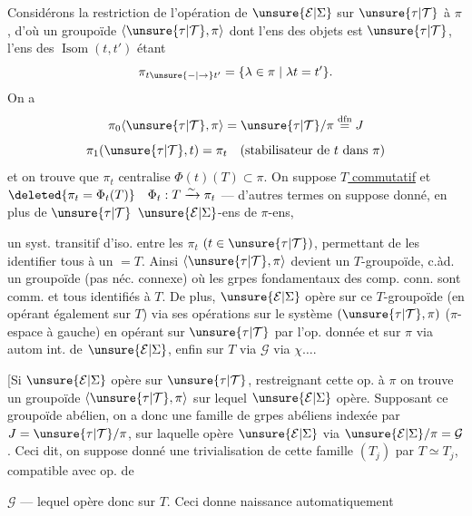 Considérons la restriction de l'opération de $\unsure{\mathcal E|\Sigma}$ sur $\unsure{\tau|\mathcal T}$ à $\pi$, d'où un groupoïde $\langle\unsure{\tau|\mathcal T},\pi\rangle$ dont l'ens des objets est $\unsure{\tau|\mathcal T}$, l'ens des $\operatorname{Isom}(t,t')$ étant
\[
\pi_{t\unsure{\mathbin{-}|\to}t'}=\{\lambda\in\pi\mid\lambda t=t'\}.
\]
 On a
\[
\pi_0\langle\unsure{\tau|\mathcal T},\pi\rangle=\unsure{\tau|\mathcal T}/\pi\overset{\mathrm{dfn}}{=}J
\]
\[
\pi_1(\unsure{\tau|\mathcal T},t)=\pi_t\quad(\text{stabilisateur de }t\text{ dans }\pi)
\]
et on trouve que $\pi_t$ centralise $\Phi(t)(T)\subset\pi$. On suppose \uline{$T$ commutatif} et $\deleted{\pi_t=\Phi_t(T)}\quad\Phi_t:T\xrightarrow{\sim}\pi_t$ ---  d'autres termes on suppose donné, en plus de $\unsure{\tau|\mathcal T}$ $\unsure{\mathcal E|\Sigma}$-ens de $\pi$-ens,

un syst. transitif d'iso. entre les $\pi_t$ $(t\in\unsure{\tau|\mathcal T})$, permettant de les identifier tous à un $=T$. Ainsi $\langle\unsure{\tau|\mathcal T},\pi\rangle$ devient un $T$-groupoïde, c.àd. un groupoïde (pas néc. connexe) où les grpes fondamentaux des comp. conn. sont comm. et tous identifiés à $T$.
De plus, $\unsure{\mathcal E|\Sigma}$ opère sur ce $T$-groupoïde (en opérant également sur $T$) via ses opérations sur le système $(\unsure{\tau|\mathcal T},\pi)$ ($\pi$-espace à gauche) en opérant sur $\unsure{\tau|\mathcal T}$ par l'op. donnée et sur $\pi$ via autom int. de $\unsure{\mathcal E|\Sigma}$, enfin sur $T$ via $\mathcal G$ via $\chi\ldots.$

[Si $\unsure{\mathcal E|\Sigma}$ opère sur $\unsure{\tau|\mathcal T}$, restreignant cette op. à $\pi$ on trouve un groupoïde $\langle\unsure{\tau|\mathcal T},\pi\rangle$ sur lequel $\unsure{\mathcal E|\Sigma}$ opère. Supposant ce groupoïde abélien, on a donc une famille de grpes abéliens  indexée par $J=\unsure{\tau|\mathcal T}/\pi$, sur laquelle opère $\unsure{\mathcal E|\Sigma}$ via $\unsure{\mathcal E|\Sigma}/\pi=\mathcal G$. Ceci dit, on suppose donné une trivialisation de cette famille $(T_j)$ par $T\simeq T_j$, compatible avec op. de

$\mathcal G$ --- lequel opère donc sur $T$. Ceci donne naissance automatiquement 

